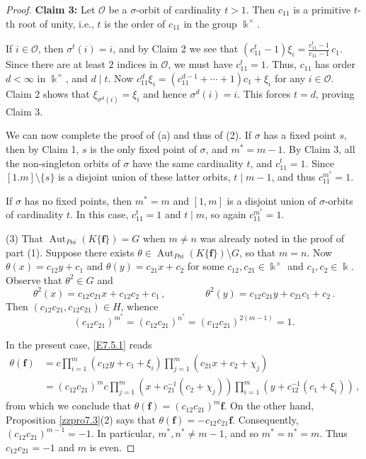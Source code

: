 \documentclass[12pt]{amsart}
\theoremstyle{plain}
\numberwithin{theorem}{section}
\numberwithin{equation}{theorem}
\theoremstyle{definition}
\DeclareMathOperator{\Aut}{Aut}
\newcommand \bff {{\mathbf{f}}}
\newcommand \calO {{\mathcal{O}}}
\newcommand \kx {\Bbbk^\times}
\begin{document}
\begin{proof}
\textbf{Claim 3:} Let $\calO$ be a $\sigma$-orbit of cardinality $t>1$.  Then $c_{11}$ is a primitive $t$-th root of unity, i.e., $t$ is the order of $c_{11}$ in the group $\kx$.

If $i \in \calO$, then $\sigma^t(i) = i$, and by Claim 2 we see that $(c_{11}^t - 1) \xi_i = \frac{c_{11}^t-1}{c_{11}-1}\, c_1$.  Since there are at least $2$ indices in $\calO$, we must have $c_{11}^t = 1$.  Thus, $c_{11}$ has order $d<\infty$ in $\kx$, and $d \mid t$.  Now $c_{11}^d \xi_i = (c_{11}^{d-1} + \cdots + 1) c_1 + \xi_i$ for any $i \in \calO$.  Claim 2 shows that $\xi_{\sigma^d(i)} = \xi_i$ and hence $\sigma^d(i) = i$.  This forces $t=d$, proving Claim 3.

We can now complete the proof of (a) and thus of (2).  If $\sigma$ has a fixed point $s$, then by Claim 1, $s$ is the only fixed point of $\sigma$, and $m^* = m-1$.  By Claim 3, all the non-singleton orbits of $\sigma$ have the same cardinality $t$, and $c_{11}^t = 1$.  Since $[1.m] \setminus \{s\}$ is a disjoint union of these latter orbits, $t \mid m-1$, and thus $c_{11}^{m^*} = 1$.

If $\sigma$ has no fixed points, then $m^* = m$ and $[1,m]$ is a disjoint union of $\sigma$-orbits of cardinality $t$.  In this case, $c_{11}^t = 1$ and $t \mid m$, so again $c_{11}^{m^*} = 1$.

(3) That $\Aut_{Poi}(K\{\bff\}) = G$ when $m \ne n$ was already noted in the proof of part (1).  Suppose there exists $\theta \in \Aut_{Poi}(K\{\bff\}) \setminus G$, so that $m=n$.  Now $\theta(x) = c_{12}y+c_1$ and $\theta(y) = c_{21}x+c_2$ for some $c_{12},c_{21} \in \kx$ and $c_1,c_2 \in \Bbbk$.  Observe that $\theta^2 \in G$ and
$$
\theta^2(x) = c_{12}c_{21} x + c_{12}c_2+c_1 \,, \qquad\qquad \theta^2(y) = c_{12}c_{21} y + c_{21}c_1+c_2 \,.
$$
Then $(c_{12}c_{21}, c_{12}c_{21}) \in H$, whence
$$
(c_{12}c_{21})^{m^*} = (c_{12}c_{21})^{n^*} = (c_{12}c_{21})^{2(m-1)} = 1.
$$

In the present case, \eqref{E7.5.1} reads
\begin{align*}
\theta(\bff) &= c \prod_{i=1}^m (c_{12}y+c_1+\xi_i) \prod_{j=1}^m (c_{21}x+c_2+\chi_j)  \\
&= (c_{12}c_{21})^m c \prod_{j=1}^m (x+c_{21}^{-1}(c_2+\chi_j)) \prod_{i=1}^m (y+c_{12}^{-1}(c_1+\xi_i)) \,,
\end{align*}
from which we conclude that $\theta(\bff) = (c_{12}c_{21})^m \bff$.  On the other hand, Proposition \ref{zzpro7.3}(2) says that $\theta(\bff) = - c_{12}c_{21} \bff$.  Consequently, $(c_{12}c_{21})^{m-1} = -1$.  In particular, $m^*,n^* \ne m-1$, and so $m^*=n^* = m$.  Thus $c_{12}c_{21} = -1$ and $m$ is even.


\end{proof}
\end{document}
